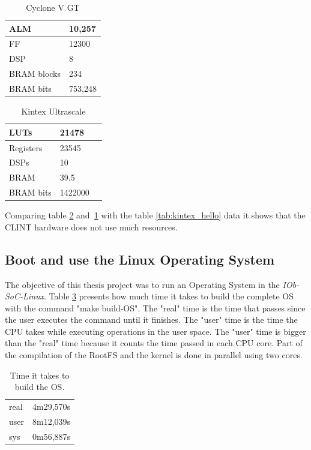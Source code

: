\begin{table}[!ht]
    \centering
    \begin{tabular}{|l|l|}
        \hline
        ALM         & 10,257  \\ \hline
        FF          & 12300   \\ \hline
        DSP         & 8       \\ \hline
        BRAM blocks & 234     \\ \hline
        BRAM bits   & 753,248 \\ \hline
    \end{tabular}
    \caption{Cyclone V GT}
    \label{tab:cyclone_int}
\end{table}
\begin{table}[!ht]
    \centering
    \begin{tabular}{|l|l|l|}
        \hline
        LUTs      & 21478   \\ \hline
        Registers & 23545   \\ \hline
        DSPs      & 10      \\ \hline
        BRAM      & 39.5    \\ \hline
        BRAM bits & 1422000 \\ \hline
    \end{tabular}
    \caption{Kintex Ultrascale}
    \label{tab:kintex_int}
\end{table}

Comparing table \ref{tab:kintex_int} and~\ref{tab:cyclone_int} with the table \ref{tab:kintex_hello} data it shows that the CLINT hardware does not use much resources.

\subsection{Boot and use the Linux Operating System}

The objective of this thesis project was to run an Operating System in the \textit{IOb-SoC-Linux}. Table \ref{tab:time_os} presents how much time it takes to build the complete OS with the command "make build-OS". The "real" time is the time that passes since the user executes the command until it finishes. The "user" time is the time the CPU takes while executing operations in the user space. The "user" time is bigger than the "real" time because it counts the time passed in each CPU core. Part of the compilation of the RootFS and the kernel is done in parallel using two cores.

\begin{table}[!ht]
    \centering
    \begin{tabular}{ll}
    real & 4m29,570s \\
    user & 8m12,039s \\
    sys  & 0m56,887s
    \end{tabular}
    \caption{Time it takes to build the OS.}
    \label{tab:time_os}
\end{table}

